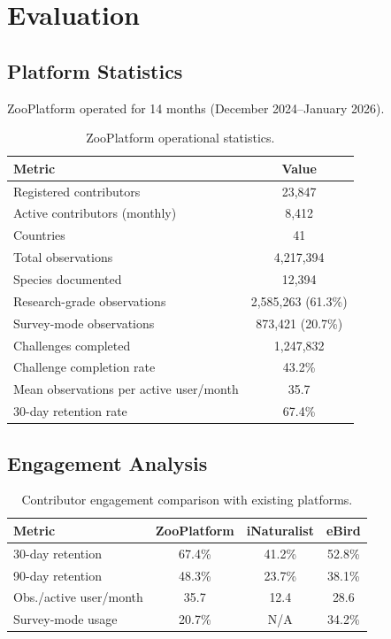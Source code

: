 \section{Evaluation}

\label{sec:evaluation}

\subsection{Platform Statistics}

ZooPlatform operated for 14 months (December 2024--January 2026).

\begin{table}[H]
\centering
\caption{ZooPlatform operational statistics.}
\label{tab:stats}
\begin{tabular}{lc}
\toprule
\textbf{Metric} & \textbf{Value} \\
\midrule
Registered contributors & 23{,}847 \\
Active contributors (monthly) & 8{,}412 \\
Countries & 41 \\
Total observations & 4{,}217{,}394 \\
Species documented & 12{,}394 \\
Research-grade observations & 2{,}585{,}263 (61.3\%) \\
Survey-mode observations & 873{,}421 (20.7\%) \\
Challenges completed & 1{,}247{,}832 \\
Challenge completion rate & 43.2\% \\
Mean observations per active user/month & 35.7 \\
30-day retention rate & 67.4\% \\
\bottomrule
\end{tabular}
\end{table}

\subsection{Engagement Analysis}

\begin{table}[H]
\centering
\caption{Contributor engagement comparison with existing platforms.}
\label{tab:engagement}
\begin{tabular}{lccc}
\toprule
\textbf{Metric} & \textbf{ZooPlatform} & \textbf{iNaturalist} &
  \textbf{eBird} \\
\midrule
30-day retention & 67.4\% & 41.2\% & 52.8\% \\
90-day retention & 48.3\% & 23.7\% & 38.1\% \\
Obs./active user/month & 35.7 & 12.4 & 28.6 \\
Survey-mode usage & 20.7\% & N/A & 34.2\% \\
\bottomrule
\end{tabular}
\end{table}

